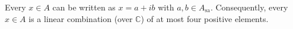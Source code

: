 Every $x \in A$ can be written as $x = a + ib$ with $a, b \in A_{\mathrm{sa}}$. Consequently, every $x \in A$ is a linear combination (over $\mathbb{C}$) of at most four positive elements.
